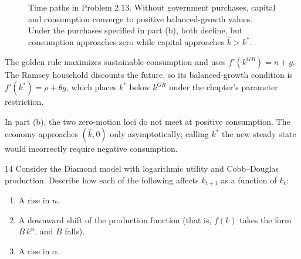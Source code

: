 \begin{solution}
\begin{figure}[H]
    \caption{Time paths in Problem 2.13. Without government purchases,
    capital and consumption converge to positive balanced-growth values.
    Under the purchases specified in part (b), both decline, but consumption
    approaches zero while capital approaches \(\widehat{k}>k^*\).}
\end{figure}
\end{solution}

\begin{note}
    The golden rule maximizes sustainable consumption and uses
    \(f'(k^{GR})=n+g\). The Ramsey household discounts the future, so its
    balanced-growth condition is \(f'(k^*)=\rho+\theta g\), which places
    \(k^*\) below \(k^{GR}\) under the chapter's parameter restriction.
\end{note}

\begin{note}
    In part (b), the two zero-motion loci do not meet at positive
    consumption. The economy approaches \((\widehat{k},0)\) only
    asymptotically; calling \(k^*\) the new steady state would incorrectly
    require negative consumption.
\end{note}

\begin{problem}{14}
Consider the Diamond model with logarithmic utility and Cobb--Douglas production. Describe how each of the following affects \(k_{t+1}\) as a function of \(k_t\):
\begin{enumerate}[label=(\alph*)]
    \item A rise in \(n\).
    \item A downward shift of the production function (that is, \(f\left(k\right)\) takes the form \(B\,k^{\alpha}\), and \(B\) falls).
    \item A rise in \(\alpha\).
\end{enumerate}
\end{problem}

